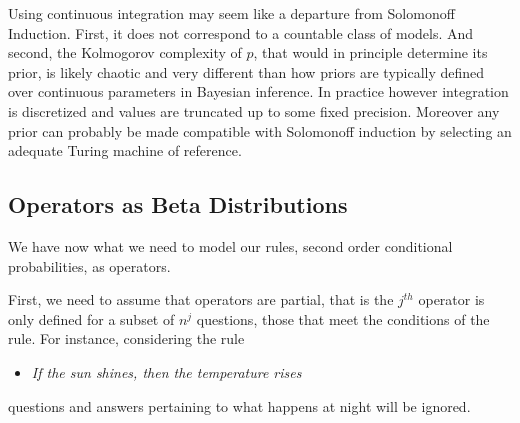 \documentclass[runningheads]{llncs}
\begin{document}
Using continuous integration may seem like a departure from Solomonoff
Induction. First, it does not correspond to a countable class of
models. And second, the Kolmogorov complexity of $p$, that would in
principle determine its prior, is likely chaotic and very different
than how priors are typically defined over continuous parameters in
Bayesian inference. In practice however integration is discretized and
values are truncated up to some fixed precision. Moreover any prior
can probably be made compatible with Solomonoff induction by selecting
an adequate Turing machine of reference.
\subsection{Operators as Beta Distributions}
\label{beta-op}
We have now what we need to model our rules, second order conditional
probabilities, as operators.

First, we need to assume that operators are partial, that is the
$j^{th}$ operator is only defined for a subset of $n^j$ questions,
those that meet the conditions of the rule. For instance, considering
the rule
\begin{itemize}
\item {\it If the sun shines, then the temperature rises}
\end{itemize}
questions and answers pertaining to what happens at night will be
ignored.
\end{document}
